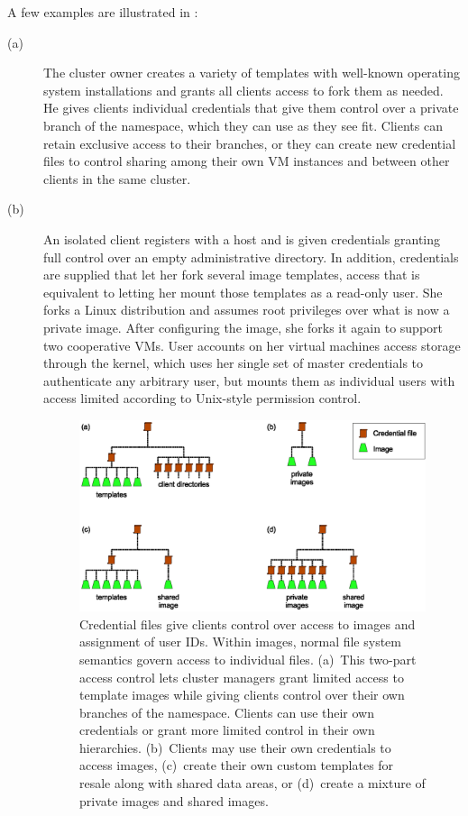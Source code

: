 A few examples are illustrated in :

\begin{description}

\item[(a)] The cluster owner creates a variety of templates with well-known operating system installations and grants all clients access to fork them as needed. He gives clients individual credentials that give them control over a private branch of the namespace, which they can use as they see fit. Clients can retain exclusive access to their branches, or they can create new credential files to control sharing among their own VM instances and between other clients in the same cluster.

\item[(b)] An isolated client registers with a host and is given credentials granting full control over an empty administrative directory. In addition, credentials are supplied that let her fork several image templates, access that is equivalent to letting her mount those templates as a read-only user. She forks a Linux distribution and assumes root privileges over what is now a private image. After configuring the image, she forks it again to support two cooperative VMs. User accounts on her virtual machines access storage through the kernel, which uses her single set of master credentials to authenticate any arbitrary user, but mounts them as individual users with access limited according to Unix-style permission control.

\begin{figure}[t]
\centering
\includegraphics[width=\figwidth]{figures/image-credentials}
\caption[File system images and credential files]{Credential files give clients control over access to images and assignment of user IDs. Within images, normal file system semantics govern access to individual files. (a)~This two-part access control lets cluster managers grant limited access to template images while giving clients control over their own branches of the namespace. Clients can use their own credentials or grant more limited control in their own hierarchies. (b)~Clients may use their own credentials to access images, (c)~create their own custom templates for resale along with shared data areas, or (d)~create a mixture of private images and shared images.}
\label{fig:image-credentials}
\end{figure}


\end{description}
